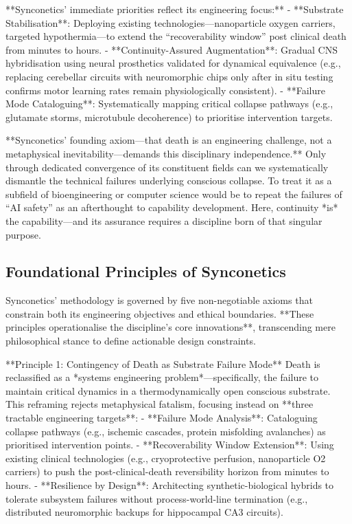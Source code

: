 \documentclass[10pt]{article}
\begin{document}
\begin{sloppypar}
  **Synconetics’ immediate priorities reflect its engineering focus:**
  - **Substrate Stabilisation**: Deploying existing technologies—nanoparticle oxygen carriers, targeted hypothermia—to extend the “recoverability window” post clinical death from minutes to hours.
  - **Continuity-Assured Augmentation**: Gradual CNS hybridisation using neural prosthetics validated for dynamical equivalence (e.g., replacing cerebellar circuits with neuromorphic chips only after in situ testing confirms motor learning rates remain physiologically consistent).
  - **Failure Mode Cataloguing**: Systematically mapping critical collapse pathways (e.g., glutamate storms, microtubule decoherence) to prioritise intervention targets.

  **Synconetics’ founding axiom—that death is an engineering challenge, not a metaphysical inevitability—demands this disciplinary independence.** Only through dedicated convergence of its constituent fields can we systematically dismantle the technical failures underlying conscious collapse. To treat it as a subfield of bioengineering or computer science would be to repeat the failures of “AI safety” as an afterthought to capability development. Here, continuity *is* the capability—and its assurance requires a discipline born of that singular purpose.

  \subsection{Foundational Principles of Synconetics}
  \label{sec:foundational-principles}

  Synconetics’ methodology is governed by five non-negotiable axioms that constrain both its engineering objectives and ethical boundaries. **These principles operationalise the discipline’s core innovations**, transcending mere philosophical stance to define actionable design constraints.

  **Principle 1: Contingency of Death as Substrate Failure Mode**
  Death is reclassified as a *systems engineering problem*—specifically, the failure to maintain critical dynamics in a thermodynamically open conscious substrate. This reframing rejects metaphysical fatalism, focusing instead on **three tractable engineering targets**:
  - **Failure Mode Analysis**: Cataloguing collapse pathways (e.g., ischemic cascades, protein misfolding avalanches) as prioritised intervention points.
  - **Recoverability Window Extension**: Using existing clinical technologies (e.g., cryoprotective perfusion, nanoparticle O2 carriers) to push the post-clinical-death reversibility horizon from minutes to hours.
  - **Resilience by Design**: Architecting synthetic-biological hybrids to tolerate subsystem failures without process-world-line termination (e.g., distributed neuromorphic backups for hippocampal CA3 circuits).


\end{sloppypar}
\end{document}
